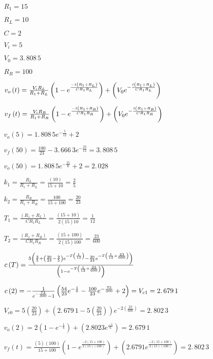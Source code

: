 \documentclass{article}
\begin{document}
$R_{1}=15$

$R_{L}=10$

$C=2$

$V_{i}=5$

$V_{0}=3.\,\allowbreak 808\,5$

$R_{R}=100$

$v_{o}\left( t\right) =\frac{V_{i}R_{L}}{R_{1}+R_{L}}\left( 1-e^{\frac{%
-t\left( R_{1}+R_{L}\right) }{CR_{1}R_{L}}}\right) +\left( V_{0}e^{-\frac{%
t\left( R_{1}+R_{L}\right) }{CR_{1}R_{L}}}\right) $

$v_{f}\left( t\right) =\frac{V_{i}R_{R}}{R_{1}+R_{R}}\left( 1-e^{\frac{%
-t\left( R_{1}+R_{R}\right) }{CR_{1}R_{R}}}\right) +\left( V_{0}e^{-\frac{%
t\left( R_{1}+R_{R}\right) }{CR_{1}R_{R}}}\right) $

$v_{o}(5)=\allowbreak 1.\,\allowbreak 808\,5e^{-\frac{5}{12}}+2$

$v_{f}\left( 50\right) \allowbreak =\allowbreak \frac{100}{23}%
-3.\,\allowbreak 666\,3e^{-\frac{23}{12}}\allowbreak =\allowbreak
3.\,\allowbreak 808\,5$

$v_{o}\left( 50\right) =\allowbreak 1.\,\allowbreak 808\,5e^{-\frac{25}{6}%
}+2=\allowbreak 2.\,\allowbreak 028$

$k_{1}=\frac{R_{L}}{R_{1}+R_{L}}=\frac{\left( 10\right) }{15+10}=\allowbreak 
\frac{2}{5}$

$k_{2}=\frac{R_{R}}{R_{1}+R_{R}}=\frac{100}{15+100}=\allowbreak \frac{20}{23}
$

$T_{1}=\frac{\left( R_{1}+R_{L}\right) }{CR_{1}R_{L}}=\frac{\left(
15+10\right) }{2\left( 15\right) 10}=\allowbreak \frac{1}{12}$

$T_{2}=\frac{\left( R_{1}+R_{R}\right) }{CR_{1}R_{R}}=\frac{\left(
15+100\right) }{2\left( 15\right) 100}=\allowbreak \frac{23}{600}$

$c\left( T\right) =\frac{5\left( \frac{2}{5}+\left( \frac{20}{23}-\frac{2}{5}%
\right) e^{-T\left( \frac{1}{12}\right) }-\frac{20}{23}e^{-T\left( \frac{1}{%
12}+\frac{23}{600}\right) }\right) }{\left( 1-e^{-T\left( \frac{1}{12}+\frac{%
23}{600}\right) }\right) }$

$c\left( 2\right) =\allowbreak -\frac{1}{e^{-\frac{73}{300}}-1}\left( \frac{%
54}{23}e^{-\frac{1}{6}}-\frac{100}{23}e^{-\frac{73}{300}}+2\right)
\allowbreak =V_{c1}\allowbreak =2.\,\allowbreak 679\,1$

$V_{c0}=5\left( \frac{20}{23}\right) +\left( 2.\,\allowbreak 679\,1-5\left( 
\frac{20}{23}\right) \right) e^{-2\left( \frac{23}{600}\right) }=\allowbreak
2.\,\allowbreak 802\,3$

$v_{o}\left( 2\right) =2\left( 1-e^{-\frac{1}{6}}\right) +\left( \allowbreak
2.8023e^{\frac{-1}{6}}\right) =\allowbreak 2.\,\allowbreak 679\,1$

$v_{f}\left( t\right) =\frac{\left( 5\right) \left( 100\right) }{15+100}%
\left( 1-e^{\frac{-2\left( 15+100\right) }{2\left( 15\right) \left(
100\right) }}\right) +\left( 2.6791e^{\frac{-2\left( 15+100\right) }{2\left(
15\right) \left( 100\right) }}\right) =\allowbreak 2.\,\allowbreak 802\,3$
\end{document}

